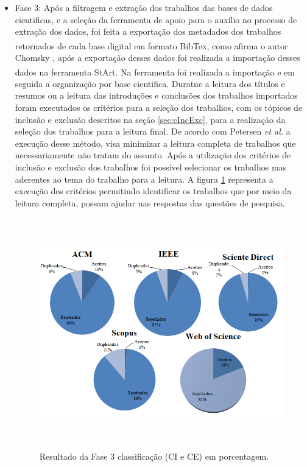 \begin{itemize}
\item Fase 3: Após a filtragem e extração dos trabalhos das bases de dados cientificas, e a seleção da ferramenta de apoio para o auxílio no processo de extração dos dados, foi feita a exportação dos metadados dos trabalhos retornados de cada base digital em formato BibTex\textsuperscript{\textregistered}, como afirma o autor Chomsky \cite{chomsky1969linguistica}, após a exportação desses dados foi realizada a importação desses dados na ferramenta \acrshort{StArt}\textsuperscript{\textregistered}. Na ferramenta foi realizada a importação e em seguida a organização por base cientifica. Duratne a leitura dos títulos e resumos ou a leitura das introduções e conclusões dos trabalhos importados foram executados os critérios para a seleção dos trabalhos, com os tópicos de inclusão e exclusão descritos na seção \ref{sec:cIncExc}, para a realização da seleção dos trabalhos para a leitura final. De acordo com Petersen \textit{et al.} \cite{petersen2008systematic} a execução desse método, visa minimizar a leitura completa de trabalhos que necessariamente não tratam do assunto. Após a utilização dos critérios de inclusão e exclusão dos trabalhos foi possível selecionar os trabalhos mas aderentes ao tema do trabalho para a leitura. A figura \ref{fig:fase3Criterios} representa a execução dos critérios permitindo identificar os trabalhos que por meio da leitura completa, possam ajudar nas respostas das questões de pesquisa.  


\begin{figure}[!htb]
\centering
\includegraphics[width = 13cm, height=10cm]{img/Classificacao_FASE_3_CI_e_CE.png}
\caption{Resultado da Fase 3 classificação (CI e CE) em porcentagem.}
\label{fig:fase3Criterios}
\end{figure}


\end{itemize}
